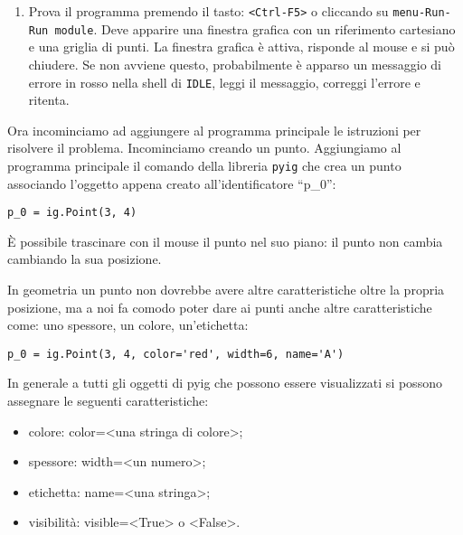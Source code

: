 \begin{enumerate} [noitemsep]
\begin{lstlisting}
# attivazione della finestra grafica
ip.mainloop()
\end{lstlisting}

\item Prova il programma premendo il tasto: 
\texttt{\textless{}Ctrl-F5\textgreater{}} o cliccando su
\texttt{menu-Run-Run module}.
Deve apparire una finestra grafica con un riferimento cartesiano e una
griglia di punti.
La finestra grafica è attiva, risponde al mouse e si può chiudere.
Se non avviene questo, probabilmente è apparso un messaggio di errore in
rosso nella shell di \texttt{IDLE},
leggi il messaggio, correggi l'errore e ritenta.

\end{enumerate}

Ora incominciamo ad aggiungere al programma principale le istruzioni per
risolvere il problema. Incominciamo creando un punto.
Aggiungiamo al programma principale il comando della libreria \texttt{pyig}  che
crea un punto associando l'oggetto appena creato all'identificatore ``p\_0'':

\begin{lstlisting}
p_0 = ig.Point(3, 4)
\end{lstlisting}

È possibile trascinare con il mouse il punto nel suo piano: il punto non cambia
cambiando la sua posizione.

In geometria un punto non dovrebbe avere altre caratteristiche oltre la propria
posizione, ma a noi fa comodo poter dare ai punti anche altre caratteristiche
come: uno spessore, un colore, un'etichetta:

\begin{lstlisting}
p_0 = ig.Point(3, 4, color='red', width=6, name='A')
\end{lstlisting}

In generale a tutti gli oggetti di pyig che possono essere visualizzati si
possono assegnare le seguenti caratteristiche:

\begin{itemize} [noitemsep]
\item colore: color=\textless{}una stringa di colore\textgreater{};
\item spessore: width=\textless{}un numero\textgreater{};
\item etichetta: name=\textless{}una stringa\textgreater{};
\item visibilità: visible=\textless{}True\textgreater{} o 
\textless{}False\textgreater{}.
\end{itemize}


